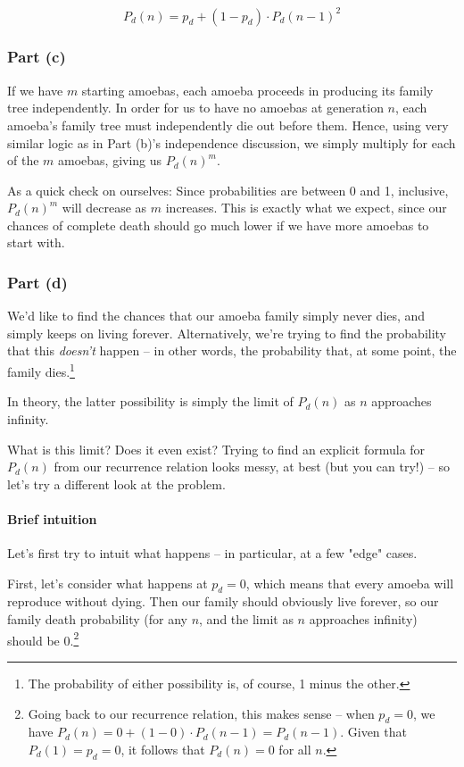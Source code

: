 \begin{equation}
P_d(n) = p_d + (1-p_d) \cdot P_d(n-1)^2
\end{equation}


\subsubsection{Part (c)}

If we have $m$ starting amoebas, each amoeba proceeds in producing its family tree independently. In order for us to have no amoebas at generation $n$, each amoeba's family tree must independently die out before them. Hence, using very similar logic as in Part (b)'s independence discussion, we simply multiply for each of the $m$ amoebas, giving us $P_d(n)^m$. 

As a quick check on ourselves: Since probabilities are between 0 and 1, inclusive, $P_d(n)^m$ will decrease as $m$ increases. This is exactly what we expect, since our chances of complete death should go much lower if we have more amoebas to start with.


\subsubsection{Part (d)}

We'd like to find the chances that our amoeba family simply never dies, and simply keeps on living forever. Alternatively, we're trying to find the probability that this \emph{doesn't} happen -- in other words, the probability that, at some point, the family dies.\footnote{The probability of either possibility is, of course, 1 minus the other.}

In theory, the latter possibility is simply the limit of $P_d(n)$ as $n$ approaches infinity. 

What is this limit? Does it even exist? Trying to find an explicit formula for $P_d(n)$ from our recurrence relation looks messy, at best (but you can try!) -- so let's try a different look at the problem.


\paragraph{Brief intuition}

Let's first try to intuit what happens -- in particular, at a few "edge" cases.

First, let's consider what happens at $p_d = 0$, which means that every amoeba will reproduce without dying. Then our family should obviously live forever, so our family death probability (for any $n$, and the limit as $n$ approaches infinity) should be 0.\footnote{Going back to our recurrence relation, this makes sense -- when $p_d = 0$, we have $P_d(n) = 0 + (1 - 0) \cdot P_d(n-1) = P_d(n-1)$. Given that $P_d(1) = p_d = 0$, it follows that $P_d(n) = 0$ for all $n$.}

